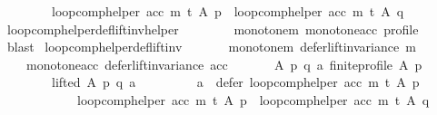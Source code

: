 \begin{isabellebody}
\ \ \ \ \ \ \ \ {\isacharparenleft}{\kern0pt}loop{\isacharunderscore}{\kern0pt}comp{\isacharunderscore}{\kern0pt}helper\ acc\ m\ t{\isacharparenright}{\kern0pt}\ A\ p\ {\isacharequal}{\kern0pt}\ {\isacharparenleft}{\kern0pt}loop{\isacharunderscore}{\kern0pt}comp{\isacharunderscore}{\kern0pt}helper\ acc\ m\ t{\isacharparenright}{\kern0pt}\ A\ q{\isachardoublequoteclose}\isanewline
%
\isadelimproof
\ \ %
\endisadelimproof
%
\isatagproof
{}\isamarkupfalse%
\ loop{\isacharunderscore}{\kern0pt}comp{\isacharunderscore}{\kern0pt}helper{\isacharunderscore}{\kern0pt}def{\isacharunderscore}{\kern0pt}lift{\isacharunderscore}{\kern0pt}inv{\isacharunderscore}{\kern0pt}helper\isanewline
\ \ \ \ \ \ \ \ monotone{\isacharunderscore}{\kern0pt}m\ monotone{\isacharunderscore}{\kern0pt}acc\ profile\isanewline
\ \ \isamarkupfalse%
\ blast%
\endisatagproof
{\isafoldproof}%
%
\isadelimproof
\isanewline
%
\endisadelimproof
\isanewline
{}\isamarkupfalse%
\ loop{\isacharunderscore}{\kern0pt}comp{\isacharunderscore}{\kern0pt}helper{\isacharunderscore}{\kern0pt}def{\isacharunderscore}{\kern0pt}lift{\isacharunderscore}{\kern0pt}inv{}{\isacharcolon}{\kern0pt}\isanewline
\ \ \isanewline
\ \ \ \ monotone{\isacharunderscore}{\kern0pt}m{\isacharcolon}{\kern0pt}\ {\isachardoublequoteopen}defer{\isacharunderscore}{\kern0pt}lift{\isacharunderscore}{\kern0pt}invariance\ m{\isachardoublequoteclose}\ \isanewline
\ \ \ \ monotone{\isacharunderscore}{\kern0pt}acc{\isacharcolon}{\kern0pt}\ {\isachardoublequoteopen}defer{\isacharunderscore}{\kern0pt}lift{\isacharunderscore}{\kern0pt}invariance\ acc{\isachardoublequoteclose}\isanewline
\ \ \isanewline
\ \ \ \ {\isachardoublequoteopen}{\isasymforall}A\ p\ q\ a{\isachardot}{\kern0pt}\ {\isacharparenleft}{\kern0pt}finite{\isacharunderscore}{\kern0pt}profile\ A\ p\ {\isasymand}\isanewline
\ \ \ \ \ \ \ \ lifted\ A\ p\ q\ a\ {\isasymand}\isanewline
\ \ \ \ \ \ \ \ a\ {\isasymin}\ {\isacharparenleft}{\kern0pt}defer\ {\isacharparenleft}{\kern0pt}loop{\isacharunderscore}{\kern0pt}comp{\isacharunderscore}{\kern0pt}helper\ acc\ m\ t{\isacharparenright}{\kern0pt}\ A\ p{\isacharparenright}{\kern0pt}{\isacharparenright}{\kern0pt}\ {\isasymlongrightarrow}\isanewline
\ \ \ \ \ \ \ \ \ \ \ \ {\isacharparenleft}{\kern0pt}loop{\isacharunderscore}{\kern0pt}comp{\isacharunderscore}{\kern0pt}helper\ acc\ m\ t{\isacharparenright}{\kern0pt}\ A\ p\ {\isacharequal}{\kern0pt}\ {\isacharparenleft}{\kern0pt}loop{\isacharunderscore}{\kern0pt}comp{\isacharunderscore}{\kern0pt}helper\ acc\ m\ t{\isacharparenright}{\kern0pt}\ A\ q{\isachardoublequoteclose}\isanewline

\end{isabellebody}
